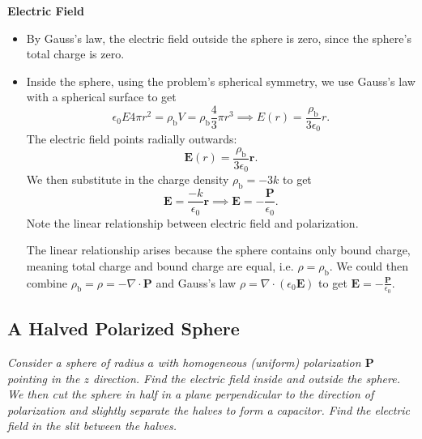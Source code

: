 \documentclass[11pt, a4paper]{article}
\renewcommand{\vec}[1]{\bm{#1}} %
\renewcommand{\r}{\vec{r}}
\newcommand{\E}{\vec{E}}  %
\newcommand{\ee}{\epsilon_{0}}  %
\renewcommand{\P}{\vec{P}}  %
\renewcommand{\div}{\nabla \cdot}
\begin{document}
\textbf{Electric Field}
\begin{itemize}
	\item By Gauss's law, the electric field outside the sphere is zero, since the sphere's total charge is zero.

	\item Inside the sphere, using the problem's spherical symmetry, we use Gauss's law with a spherical surface to get
	\begin{equation*}
		\ee E 4\pi r^{2} = \rho_{\text{b}} V = \rho_{\text{b}} \frac{4}{3}\pi r^{3} \implies E(r) = \frac{\rho_{\text{b}}}{3 \ee} r.
	\end{equation*} 
	The electric field points radially outwards:
	\begin{equation*}
		\E(r) = \frac{\rho_{\text{b}}}{3 \ee} \r.
	\end{equation*}
	We then substitute in the charge density $ \rho_{\text{b}} = -3k $ to get
	\begin{equation*}
		\E = \frac{-k}{\ee}\r \implies \E = - \frac{\P}{\ee}.
	\end{equation*}
	Note the linear relationship between electric field and polarization.
	
	The linear relationship arises because the sphere contains only bound charge, meaning total charge and bound charge are equal, i.e. $ \rho = \rho_{\text{b}} $. We could then combine $ \rho_{\text{b}} = \rho = - \div \P $ and Gauss's law $ \rho = \div (\ee \E) $ to get  $ \E = - \frac{\P}{\ee} $.
	
\end{itemize}

\subsection{A Halved Polarized Sphere}
\textit{Consider a sphere of radius $ a $ with homogeneous (uniform) polarization $ \P $ pointing in the $ z $ direction. Find the electric field inside and outside the sphere. We then cut the sphere in half in a plane perpendicular to the direction of polarization and slightly separate the halves to form a capacitor. Find the electric field in the slit between the halves.}
\end{document}
